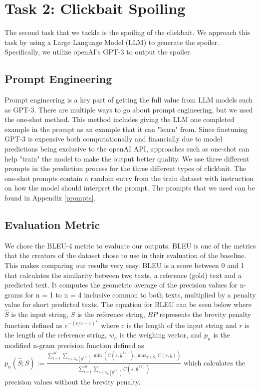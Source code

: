 \documentclass[12pt]{article}
\begin{document}
\section{Task 2: Clickbait Spoiling}
The second task that we tackle is the spoiling of the clickbait. We approach this task by using a Large Language Model (LLM) to generate the spoiler. Specifically, we utilize openAI's GPT-3 to output the spoiler. \cite{DBLP:journals/corr/abs-2005-14165}
\subsection{Prompt Engineering}
Prompt engineering is a key part of getting the full value from LLM models such as GPT-3. There are multiple ways to go about prompt engineering, but we used the one-shot method. This method includes giving the LLM one completed example in the prompt as an example that it can "learn" from. Since finetuning GPT-3 is expensive both computationally and financially due to model predictions being exclusive to the openAI API, approaches such as one-shot can help "train" the model to make the output better quality. We use three different prompts in the prediction process for the three different types of clickbait. The one-shot prompts contain a random entry from the train dataset with instruction on how the model should interpret the prompt. The prompts that we used can be found in Appendix \ref{prompts}.


\subsection{Evaluation Metric}
\label{evalmetric}
We chose the BLEU-4 metric to evaluate our outputs. \cite{papineni_roukos_ward_zhu_2001} BLEU is one of the metrics that the creators of the dataset chose to use in their evaluation of the baseline. This makes comparing our results very easy. BLEU is a score between 0 and 1 that calculates the similarity between two texts, a reference (gold) text and a predicted text. It computes the geometric average of the precision values for n-grams for n = 1 to n = 4 inclusive common to both texts, multiplied by a penalty value for short predicted texts. The equation for BLEU can be seen below where $\hat{S}$ is the input string, $S$ is the reference string, $BP$ represents the brevity penalty function defined as $e^{-(r/c -1)^+}$ where $c$ is the length of the input string and $r$ is the length of the reference string, $w_n$ is the weighing vector, and $p_n$ is the modified n-gram precision function defined as $p_n(\hat S; S):= \frac{\sum_{i=1}^M\sum_{s\in G_n( \hat y^{(i)})} \min(C(s, \hat y^{(i)}), \max_{y\in S_i} C(s, y))}{\sum_{i=1}^M\sum_{s\in G_n( \hat y^{(i)})} C(s, \hat y^{(i)})}$ which calculates the precision values without the brevity penalty. 
\end{document}
